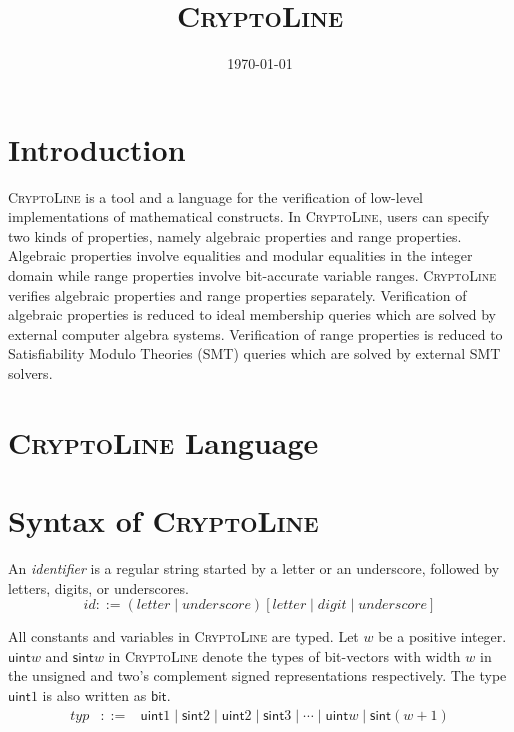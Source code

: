 \documentclass{article}
\newcommand{\cryptoline}{\textsc{CryptoLine}\xspace}
\newcommand{\id}{\mathit{id}\xspace}
\newcommand{\typ}{\mathit{typ}\xspace}
\newcommand{\letter}{\mathit{letter}\xspace}
\newcommand{\digit}{\mathit{digit}\xspace}
\newcommand{\underscore}{\mathit{underscore}\xspace}
\newcommand{\uint}{\mathsf{uint}\xspace}
\newcommand{\sint}{\mathsf{sint}\xspace}
\newcommand{\bit}{\mathsf{bit}\xspace}
\begin{document}
\title{\cryptoline}
\date{\today}
\maketitle

\section{Introduction}

\cryptoline is a tool and a language for the verification of low-level
implementations of mathematical constructs.
In \cryptoline, users can specify two kinds of properties,
namely algebraic properties and range properties.
Algebraic properties involve equalities and modular equalities in the
integer domain while range properties involve bit-accurate variable
ranges.
\cryptoline verifies algebraic properties and range properties
separately.
Verification of algebraic properties is reduced to ideal membership
queries which are solved by external computer algebra systems.
Verification of range properties is reduced to Satisfiability Modulo
Theories (SMT) queries which are solved by external SMT solvers.

\section{\cryptoline Language}


\appendix
\section{Syntax of \cryptoline}

An \emph{identifier} is a regular string started by a letter or an
underscore, followed by letters, digits, or underscores.
\[
\id ::= (\letter \mid \underscore) [ \letter \mid \digit \mid \underscore ]
\]

All constants and variables in \cryptoline are typed.
Let $w$ be a positive integer.
$\uint w$ and $\sint w$ in \cryptoline denote the types of bit-vectors
with width $w$ in the unsigned and two's complement signed
representations respectively.
The type $\uint 1$ is also written as $\bit$.
\[
  \begin{array}{rcl}
    \typ & ::= & \uint 1 \mid \sint 2 \mid \uint 2 \mid \sint 3 \mid
                \cdots \mid \uint w \mid \sint (w+1)
  \end{array}
\]
\end{document}
